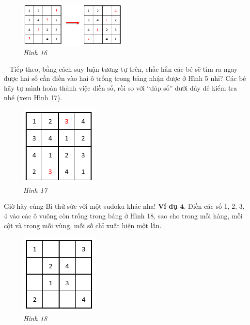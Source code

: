 	\begin{multicols}{2}
		\begin{figure}[H]
			\centering
			\vspace*{5pt}
			\captionsetup{labelformat= empty, justification=centering}
			\includegraphics[width=0.48\textwidth]{pic5}
			\caption{\small\textit{Hình 16}}
			\vspace*{-10pt}
		\end{figure}
		-- Tiếp theo, bằng cách suy luận tương tự trên, chắc hẳn các bé sẽ tìm ra ngay được hai số cần điền vào hai ô trống trong bảng nhận được ở Hình 5 nhỉ? Các bé hãy tự mình hoàn thành việc điền số, rồi so với “đáp số” dưới đây để kiểm tra nhé (xem Hình 17).
		\begin{figure}[H]
			\centering
			\vspace*{-10pt}
			\captionsetup{labelformat= empty, justification=centering}
			\includegraphics[scale=1]{pic6}
			\caption{\small\textit{Hình 17}}
			\vspace*{-5pt}
		\end{figure}
	\end{multicols}
	Giờ hãy cùng Bi thử sức với một sudoku  khác nha!
	\vskip 0.1cm
		\textbf{Ví dụ $\pmb{4.}$} Điền các số 1, 2, 3, 4 vào các ô vuông còn trống trong bảng ở Hình 18, sao cho trong mỗi hàng, mỗi cột và trong mỗi vùng, mỗi số chỉ xuất hiện một lần.
		\vskip 0.1cm
		\begin{figure}
			\centering
			\vspace*{-35pt}
			\captionsetup{labelformat= empty, justification=centering}
			\includegraphics[scale=0.9]{pic7}
			\caption{\small\textit{Hình 18}}
			\vspace*{-20pt}
		\end{figure}
